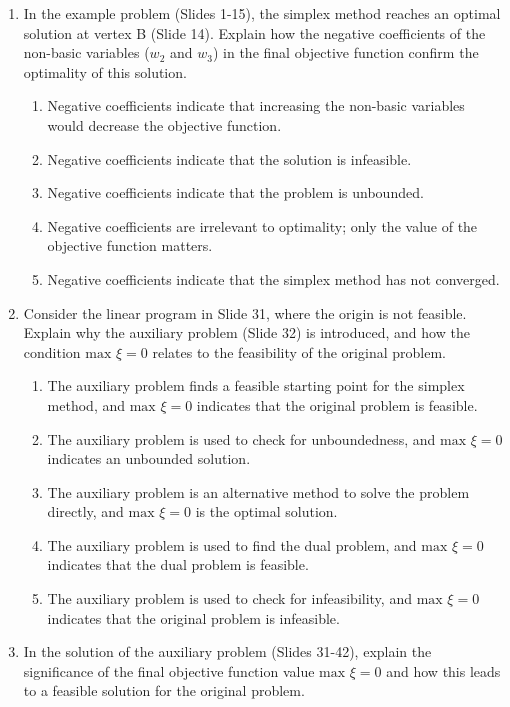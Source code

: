 \documentclass{article}%
\begin{document}
\begin{enumerate}
\begin{enumerate}
\vspace{0.5em}%
\item In the example problem (Slides 1-15), the simplex method reaches an optimal solution at vertex B (Slide 14).  Explain how the negative coefficients of the non-basic variables ($w_2$ and $w_3$) in the final objective function confirm the optimality of this solution.%
\begin{enumerate}%
\item Negative coefficients indicate that increasing the non-basic variables would decrease the objective function.%
\item Negative coefficients indicate that the solution is infeasible.%
\item Negative coefficients indicate that the problem is unbounded.%
\item Negative coefficients are irrelevant to optimality; only the value of the objective function matters.%
\item Negative coefficients indicate that the simplex method has not converged.%
\end{enumerate}%
\vspace{0.5em}%
\item Consider the linear program in Slide 31, where the origin is not feasible. Explain why the auxiliary problem (Slide 32) is introduced, and how the condition $\text{max } \xi = 0$ relates to the feasibility of the original problem.%
\begin{enumerate}%
\item The auxiliary problem finds a feasible starting point for the simplex method, and $\text{max } \xi = 0$ indicates that the original problem is feasible.%
\item The auxiliary problem is used to check for unboundedness, and $\text{max } \xi = 0$ indicates an unbounded solution.%
\item The auxiliary problem is an alternative method to solve the problem directly, and $\text{max } \xi = 0$ is the optimal solution.%
\item The auxiliary problem is used to find the dual problem, and $\text{max } \xi = 0$ indicates that the dual problem is feasible.%
\item The auxiliary problem is used to check for infeasibility, and $\text{max } \xi = 0$ indicates that the original problem is infeasible.%
\end{enumerate}%
\vspace{0.5em}%
\item In the solution of the auxiliary problem (Slides 31-42), explain the significance of the final objective function value $\text{max } \xi = 0$ and how this leads to a feasible solution for the original problem.%

\end{enumerate}
\end{enumerate}
\end{document}
